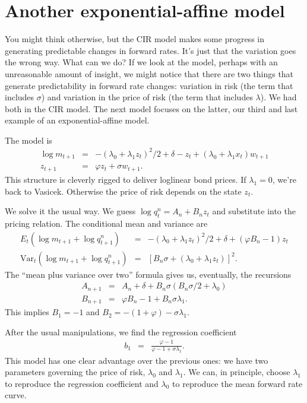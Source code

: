 \documentclass[11pt]{article}
\begin{document}


\section{Another exponential-affine model}

You might think otherwise, but the CIR model makes some progress in generating
predictable changes in forward rates.
It's just that the variation goes the wrong way.
What can we do?
If we look at the model, perhaps with an unreasonable amount
of insight,
we might notice that there are two things
that generate predictability in forward rate changes:
variation in risk (the term that includes $\sigma$)
and variation in the price of risk (the term that includes $\lambda$).
We had both in the CIR model.
The next model focuses on the latter,
our third and last example of an exponential-affine model.


The model is
\begin{eqnarray*}
    \log m_{t+1} &=& - (\lambda_0 + \lambda_1 z_t)^2/2 + \delta - z_t
            + (\lambda_0 + \lambda_1 x_t) w_{t+1} \\
            z_{t+1} &=& \varphi z_t + \sigma w_{t+1} .
\end{eqnarray*}
This structure is cleverly rigged to deliver loglinear bond prices.
If $\lambda_1 = 0$, we're back to Vasicek.
Otherwise the price of risk depends on the state $z_t$.

We solve it the usual way.
We guess  $ \log q^n_t = A_n + B_n z_t$ and substitute into the
pricing relation.
The conditional mean and variance are
\begin{eqnarray*}
   E_t \left( \log m_{t+1} + \log q^{n}_{t+1} \right) &=&
            - (\lambda_0 + \lambda_1 z_t)^2/2 + \delta + (\varphi B_n -1) z_t  \\
   \mbox{Var}_t \left( \log m_{t+1} + \log q^{n}_{t+1} \right) &=&
            \left[B_n \sigma + (\lambda_0 + \lambda_1 z_t)\right]^2  .
\end{eqnarray*}
The ``mean plus variance over two'' formula gives us, eventually,
the recursions
\begin{eqnarray*}
    A_{n+1} &=& A_n + \delta + B_n \sigma (B_n \sigma/2 + \lambda_0) \\
    B_{n+1} &=& \varphi B_n - 1 + B_n \sigma \lambda_1 .
\end{eqnarray*}
This implies
$B_1 = -1$ and $B_2 = -(1+\varphi) - \sigma \lambda_1 $.


After the usual manipulations,
we find the regression coefficient
\begin{eqnarray*}
    b_1 &=& \frac{\varphi-1}{\varphi-1+\sigma\lambda_1} .
\end{eqnarray*}
This model has one clear advantage over the previous ones:
we have two parameters governing the price of risk,
$\lambda_0$ and $\lambda_1$.
We can, in principle, choose $\lambda_1$ to reproduce
the regression coefficient and $\lambda_0$ to reproduce the
mean forward rate curve.
\end{document}
